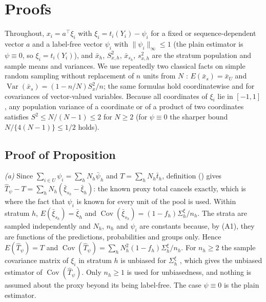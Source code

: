 \section{Proofs}\label{si:proofs}\label{sec:theory-proofs}

Throughout, $x_i=a^\top\xi_i$ with $\xi_i=t_i(Y_i)-\psi_i$ for a fixed or sequence-dependent vector $a$ and a
label-free vector $\psi_i$ with $\|\psi_i\|_\infty\le1$ (the plain estimator is $\psi\equiv0$, so $\xi_i=t_i(Y_i)$), and
$\bar x_h$, $S^2_{x,h}$, $\bar x_{s_h}$, $s^2_{x,h}$ are the stratum population and sample means
and variances. We use repeatedly two classical facts on simple random sampling without
replacement of $n$ units from $N$ \citep[Ch.~2]{cochran1977}: $E(\bar x_s)=\bar x_U$ and
$\operatorname{Var}(\bar x_s)=(1-n/N)S^2_x/n$; the same formulas hold coordinatewise and for
covariances of vector-valued variables. Because all coordinates of $\xi_i$ lie in $[-1,1]$, any population
variance of a coordinate or of a product of two coordinates satisfies
$S^2\le N/(N-1)\le2$ for $N\ge2$ (for $\psi\equiv0$ the sharper bound $N/\{4(N-1)\}\le1/2$ holds).

\subsection{Proof of Proposition~}

\emph{(a)} Since $\sum_{i\in U}\psi_i=\sum_hN_h\bar\psi_h$ and $T=\sum_hN_h\bar t_h$, definition () gives
$\hat T_\psi-T=\sum_hN_h(\bar\xi_{s_h}-\bar\xi_h)$: the known proxy total cancels exactly, which is where the
fact that $\psi_i$ is known for every unit of the pool is used. Within stratum $h$,
$E(\bar\xi_{s_h})=\bar\xi_h$ and $\operatorname{Cov}(\bar\xi_{s_h})=(1-f_h)\Sigma^\xi_h/n_h$. The strata are sampled independently and
$N_h$, $n_h$ and $\psi_i$ are constants because, by (A1), they are functions of the predictions, probabilities
and groups only. Hence $E(\hat T_\psi)=T$ and
$\operatorname{Cov}(\hat T_\psi)=\sum_hN_h^2(1-f_h)\Sigma^\xi_h/n_h$. For $n_h\ge2$ the sample covariance matrix of
$\xi_i$ in stratum $h$ is unbiased for $\Sigma^\xi_h$ \citep[Ch.~2]{cochran1977}, which gives the unbiased estimator of
$\operatorname{Cov}(\hat T_\psi)$. Only $n_h\ge1$ is used for unbiasedness, and nothing is
assumed about the proxy beyond its being label-free. The case $\psi\equiv0$ is the plain estimator.

